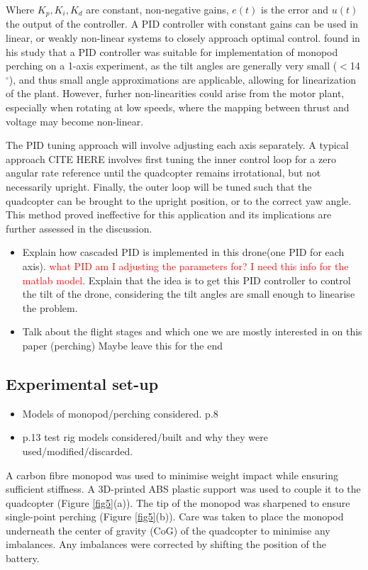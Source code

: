 \documentclass[12pt,a4paper]{article}
\begin{document}
Where $K_p, K_i, K_d$ are constant, non-negative gains, $e(t)$ is the error and $u(t)$ the output of the controller. A PID controller with constant gains can be used in linear, or weakly non-linear systems to closely approach optimal control. \cite{Hao} found in his study that a PID controller was suitable for implementation of monopod perching on a 1-axis experiment, as the tilt angles are generally very small ($<$14$^{\circ}$), and thus small angle approximations are applicable, allowing for linearization of the plant. However, furher non-linearities could arise from the motor plant, especially when rotating at low speeds, where the mapping between thrust and voltage may become non-linear.

The PID tuning approach will involve adjusting each axis separately. A typical approach CITE HERE involves first tuning the inner control loop for a zero angular rate reference until the quadcopter remains irrotational, but not necessarily upright. Finally, the outer loop will be tuned such that the quadcopter can be brought to the upright position, or to the correct yaw angle. This method proved ineffective for this application and its implications are further assessed in the discussion.

\begin{itemize}
\item Explain how cascaded PID is implemented in this drone(one PID for each axis). \textcolor{red}{what PID am I adjusting the parameters for? I need this info for the matlab model}. Explain that the idea is to get this PID controller to control the tilt of the drone, considering the tilt angles are small enough to linearise the problem.
\item Talk about the flight stages and which one we are mostly interested in on this paper (perching) Maybe leave this for the end
\end{itemize}

\subsection{Experimental set-up}
\begin{itemize}
\item Models of monopod/perching considered. p.8
\item p.13 test rig models considered/built and why they were used/modified/discarded.
\end{itemize}
A carbon fibre monopod was used to minimise weight impact while ensuring sufficient stiffness. A 3D-printed ABS plastic support was used to couple it to the quadcopter (Figure \ref{fig5}(a)). The tip of the monopod was sharpened to ensure single-point perching (Figure \ref{fig5}(b)). Care was taken to place the monopod underneath the center of gravity (CoG) of the quadcopter to minimise any imbalances. Any imbalances were corrected by shifting the position of the battery.
\end{document}
